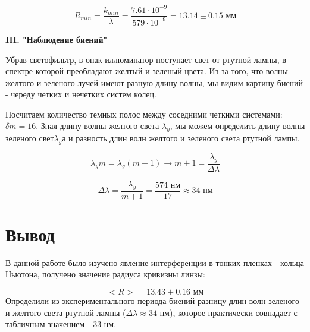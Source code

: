 \documentclass[a4paper,12pt]{report}
\begin{document}
\begin{equation*}
    R_{min} = \frac{k_{min}}{\lambda} = \frac{7.61 \cdot 10^{-9}}{579 \cdot 10^{-9}} = 13.14 \pm 0.15 \text{ мм} 
\end{equation*}
	
\vspace{\baselineskip}
\noindent\textbf{III. "Наблюдение биений"}

Убрав светофильтр, в опак-иллюминатор поступает свет от ртутной лампы, в спектре которой преобладают желтый и зеленый цвета. Из-за того, что волны желтого и зеленого лучей имеют разную длину волны, мы видим картину биений - череду четких и нечетких систем колец.

Посчитаем количество темных полос между соседними четкими системами: $\delta m = 16$. Зная длину волны желтого света $\lambda_{y}$, мы можем определить длину волны зеленого свет$\lambda_{g}$а и разность длин волн желтого и зеленого света ртутной лампы.

\begin{equation*}
    \lambda_{y}m=\lambda_{g}(m+1) \rightarrow m+1 =\frac{\lambda_{y}}{\Delta\lambda}
\end{equation*}

\begin{equation*}
    \Delta\lambda=\frac{\lambda_{y}}{m+1} = \frac{574 \text{ нм}}{17} \approx 34 \text{ нм}
\end{equation*}

\section*{Вывод}

В данной работе было изучено явление интерференции в тонких пленках - кольца Ньютона, получено значение радиуса кривизны линзы:

\begin{equation*}
    < R > = 13.43 \pm 0.16 \text{ мм}
\end{equation*}
Определили из экспериментального периода биений разницу длин волн зеленого и желтого света ртутной лампы ($\Delta\lambda \approx 34 $ нм), которое практически совпадает с табличным значением - 33 нм.
\end{document}
